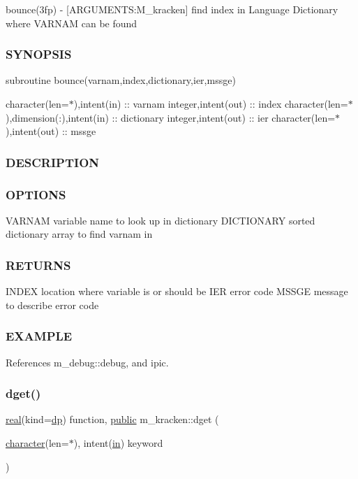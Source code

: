 bounce(3fp) -\/ \mbox{[}A\+R\+G\+U\+M\+E\+N\+TS\+:M\+\_\+kracken\mbox{]} find index in Language Dictionary where V\+A\+R\+N\+AM can be found \subsubsection*{S\+Y\+N\+O\+P\+S\+IS}

subroutine bounce(varnam,index,dictionary,ier,mssge)

character(len=$\ast$),intent(in) \+:\+: varnam integer,intent(out) \+:\+: index character(len=$\ast$),dimension(\+:),intent(in) \+:\+: dictionary integer,intent(out) \+:\+: ier character(len=$\ast$),intent(out) \+:\+: mssge

\subsubsection*{D\+E\+S\+C\+R\+I\+P\+T\+I\+ON}

\subsubsection*{O\+P\+T\+I\+O\+NS}

V\+A\+R\+N\+AM variable name to look up in dictionary D\+I\+C\+T\+I\+O\+N\+A\+RY sorted dictionary array to find varnam in

\subsubsection*{R\+E\+T\+U\+R\+NS}

I\+N\+D\+EX location where variable is or should be I\+ER error code M\+S\+S\+GE message to describe error code

\subsubsection*{E\+X\+A\+M\+P\+LE}

References m\+\_\+debug\+::debug, and ipic.

\mbox{\label{namespacem__kracken_ae7b6ad046d637f03148efb56336a7ff4}} 
\subsubsection{\texorpdfstring{dget()}{dget()}}
{\footnotesize\ttfamily \hyperlink{read__watch_83_8txt_abdb62bde002f38ef75f810d3a905a823}{real}(kind=\hyperlink{namespacem__kracken_a1de91e5ca55bf4fab118936bf4fad36a}{dp}) function, \hyperlink{M__stopwatch_83_8txt_a2f74811300c361e53b430611a7d1769f}{public} m\+\_\+kracken\+::dget (\begin{DoxyParamCaption}\item[{\hyperlink{option__stopwatch_83_8txt_abd4b21fbbd175834027b5224bfe97e66}{character}(len=$\ast$), intent(\hyperlink{M__journal_83_8txt_afce72651d1eed785a2132bee863b2f38}{in})}]{keyword }\end{DoxyParamCaption})}



